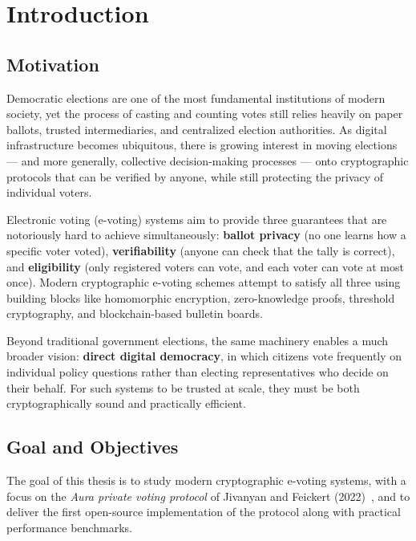 \documentclass[12pt,a4paper,oneside]{report}
\begin{document}
\chapter*{Introduction}

\section*{Motivation}
Democratic elections are one of the most fundamental institutions of modern 
society, yet the process of casting and counting votes still relies heavily 
on paper ballots, trusted intermediaries, and centralized election authorities. 
As digital infrastructure becomes ubiquitous, there is growing interest in 
moving elections --- and more generally, collective decision-making processes 
--- onto cryptographic protocols that can be verified by anyone, while still 
protecting the privacy of individual voters.

Electronic voting (e-voting) systems aim to provide three guarantees that 
are notoriously hard to achieve simultaneously: \textbf{ballot privacy} 
(no one learns how a specific voter voted), \textbf{verifiability} (anyone 
can check that the tally is correct), and \textbf{eligibility} (only 
registered voters can vote, and each voter can vote at most once). Modern 
cryptographic e-voting schemes attempt to satisfy all three using building 
blocks like homomorphic encryption, zero-knowledge proofs, threshold 
cryptography, and blockchain-based bulletin boards.

Beyond traditional government elections, the same machinery enables a much 
broader vision: \textbf{direct digital democracy}, in which citizens vote 
frequently on individual policy questions rather than electing representatives 
who decide on their behalf. For such systems to be trusted at scale, they 
must be both cryptographically sound and practically efficient.

\section*{Goal and Objectives}
The goal of this thesis is to study modern cryptographic e-voting systems, 
with a focus on the \textit{Aura private voting protocol} of Jivanyan and 
Feickert (2022)~\cite{aura2022}, and to deliver the first open-source 
implementation of the protocol along with practical performance benchmarks.
\end{document}
